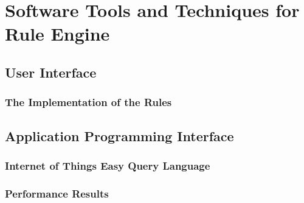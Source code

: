 \chapter{Software Tools and Techniques for Rule Engine}

\section{User Interface}

\subsection{The Implementation of the Rules}

\section{Application Programming Interface}

\subsection{Internet of Things Easy Query Language}

\subsection{Performance Results}